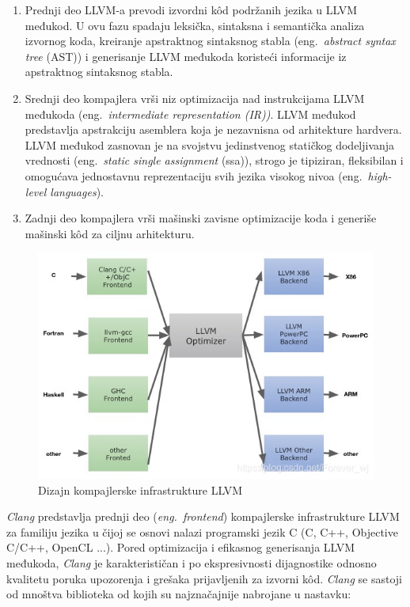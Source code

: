 \documentclass[12pt,oneside]{memoir}
\begin{document}
\begin{enumerate}
  \item Prednji deo LLVM-a prevodi izvordni k\^od podr\v{z}anih jezika u LLVM međukod. U ovu fazu spadaju leksi\v{c}ka, sintaksna i semanti\v{c}ka analiza
  izvornog koda, kreiranje apstraktnog sintaksnog stabla (eng.~\textit{abstract syntax tree} (AST)) i generisanje LLVM međukoda koriste\'{c}i informacije iz apstraktnog sintaksnog stabla.
  \item{Srednji deo kompajlera vr\v{s}i niz optimizacija nad instrukcijama LLVM međukoda (eng.~\textit{intermediate representation (IR))}. LLVM međukod predstavlja apstrakciju asemblera koja je nezavnisna od arhitekture hardvera. LLVM međukod zasnovan je na svojstvu jedinstvenog stati\v{c}kog dodeljivanja vrednosti (eng.~\textit{static single assignment} (ssa)), strogo je tipiziran, fleksibilan i omogu\'{c}ava jednostavnu reprezentaciju svih jezika visokog nivoa (eng.~\textit{high-level languages}).}
  \item{Zadnji deo kompajlera vr\v{s}i ma\v{s}inski zavisne optimizacije koda i generi\v{s}e ma\v{s}inski k\^{o}d  za ciljnu arhitekturu.}
\end{enumerate}

\begin{figure}[!h]
\begin{center}
\includegraphics[scale=0.4]{llvmDesign.jpg}
\end{center}
\caption{Dizajn kompajlerske infrastrukture LLVM}
\label{fig:exploded}
\end{figure}


\textit{Clang} predstavlja prednji deo (\textit{eng.~frontend}) kompajlerske infrastrukture LLVM za familiju jezika u \v{c}ijoj se osnovi nalazi programski jezik C (C, C++, Objective C/C++, OpenCL ...). Pored optimizacija i efikasnog generisanja LLVM međukoda, \textit{Clang} je karakterističan i po ekspresivnosti dijagnostike odnosno kvalitetu poruka upozorenja i grešaka prijavljenih za izvorni k\^{o}d. \textit{Clang} se sastoji od mnoštva biblioteka od kojih su najznačajnije nabrojane u nastavku:
\end{document}
